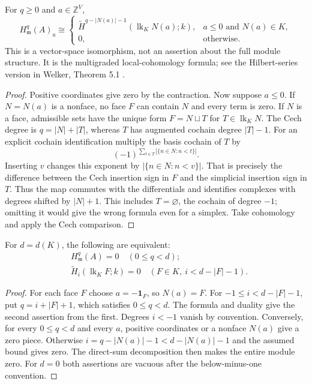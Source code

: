 \begin{theorem}\label{thm:lc-link}
For $q\ge0$ and $a\in\mathbb Z^V$,
\[
 H^q_{\mathfrak m}(A)_a\cong
 \begin{cases}
 \widetilde H^{q-|N(a)|-1}(\operatorname{lk}_K N(a);k),
   & a\le0\text{ and }N(a)\in K,\\
 0,&\text{otherwise}.
 \end{cases}
\]
This is a vector-space isomorphism, not an assertion about the full module
structure. It is the multigraded local-cohomology formula; see the
Hilbert-series version in Welker, Theorem 5.1 \cite{welker}.
\end{theorem}
\begin{proof}
Positive coordinates give zero by the contraction. Now suppose $a\le0$.
If $N=N(a)$ is a nonface, no face $F$ can contain $N$ and every term is
zero. If $N$ is a face, admissible sets have the unique form
$F=N\sqcup T$ for $T\in\operatorname{lk}_K N$.
The Cech degree is $q=|N|+|T|$, whereas $T$ has augmented cochain degree
$|T|-1$. For an explicit cochain identification multiply the basis
cochain of $T$ by
\[
 (-1)^{\sum_{t\in T}|\{n\in N:n<t\}|}.
\]
Inserting $v$ changes this exponent by $|\{n\in N:n<v\}|$.
That is precisely the difference between the Cech insertion sign in $F$
and the simplicial insertion sign in $T$. Thus the map commutes with the
differentials and identifies complexes with degrees shifted by $|N|+1$.
This includes $T=\varnothing$, the cochain of degree $-1$; omitting it
would give the wrong formula even for a simplex. Take cohomology and
apply the Cech comparison.
\end{proof}

\begin{corollary}\label{cor:uniform}
For $d=d(K)$, the following are equivalent:
\[
 \begin{split}
 &H^q_{\mathfrak m}(A)=0\quad(0\le q<d);\\
 &\widetilde H_i(\operatorname{lk}_K F;k)=0
   \quad(F\in K,\ i<d-|F|-1).
 \end{split}
\]
\end{corollary}
\begin{proof}
For each face $F$ choose $a=-\mathbf1_F$, so $N(a)=F$. For
$-1\le i<d-|F|-1$, put $q=i+|F|+1$, which satisfies $0\le q<d$.
The formula and duality give the second assertion from the first. Degrees
$i<-1$ vanish by convention. Conversely, for every $0\le q<d$ and
every $a$, positive coordinates or a nonface $N(a)$ give a zero piece.
Otherwise $i=q-|N(a)|-1<d-|N(a)|-1$ and the assumed bound gives zero.
The direct-sum decomposition then makes the entire module zero.
For $d=0$ both assertions are vacuous after the below-minus-one convention.
\end{proof}

